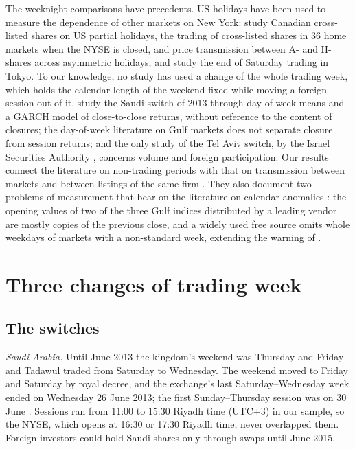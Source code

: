 The weeknight comparisons have precedents. US holidays have been used to measure the dependence of other markets on New York: \citet{TannousZhang2008} study Canadian cross-listed shares on US partial holidays, \citet{DoddFrijns2018} the trading of cross-listed shares in 36 home markets when the NYSE is closed, and \citet{Bao2023} price transmission between A- and H-shares across asymmetric holidays; \citet{Barclay1990} and \citet{Hiraki1994} study the end of Saturday trading in Tokyo. To our knowledge, no study has used a change of the whole trading week, which holds the calendar length of the weekend fixed while moving a foreign session out of it. \citet{Alsayari2022} study the Saudi switch of 2013 through day-of-week means and a GARCH model of close-to-close returns, without reference to the content of closures; the day-of-week literature on Gulf markets \citep{Ariss2011,Shehadeh2023} does not separate closure from session returns; and the only study of the Tel Aviv switch, by the Israel Securities Authority \citep{ISA2026}, concerns volume and foreign participation. Our results connect the literature on non-trading periods \citep{OldfieldRogalski1980,Ito1998,JonesKaulLipson1994,HongWang2000} with that on transmission between markets \citep{Hamao1990,Lin1994} and between listings of the same firm \citep{Hauser1998,Qadan2012}. They also document two problems of measurement that bear on the literature on calendar anomalies \citep{French1980,LakonishokSmidt1988,Connolly1989,Schwert2003}: the opening values of two of the three Gulf indices distributed by a leading vendor are mostly copies of the previous close, and a widely used free source omits whole weekdays of markets with a non-standard week, extending the warning of \citet{InceP2006}.

\section{Three changes of trading week}\label{sec:setting}

\subsection{The switches}
\emph{Saudi Arabia.} Until June 2013 the kingdom's weekend was Thursday and Friday and Tadawul traded from Saturday to Wednesday. The weekend moved to Friday and Saturday by royal decree, and the exchange's last Saturday--Wednesday week ended on Wednesday 26 June 2013; the first Sunday--Thursday session was on 30 June \citep{Alsayari2022}. Sessions ran from 11:00 to 15:30 Riyadh time (UTC+3) in our sample, so the NYSE, which opens at 16:30 or 17:30 Riyadh time, never overlapped them. Foreign investors could hold Saudi shares only through swaps until June 2015.

